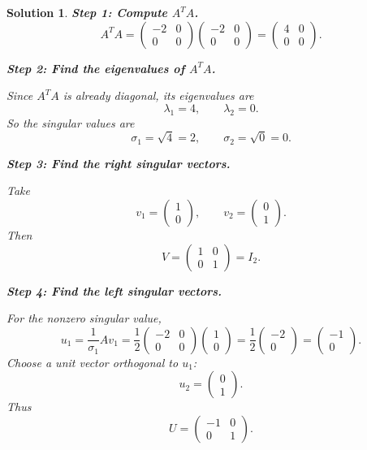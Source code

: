 \documentclass[11pt,a4paper]{article}
\theoremstyle{sol}
\newtheorem*{solution}{Solution}
\begin{document}
\begin{solution}
\textbf{Step 1: Compute $A^TA$.}
\[
A^TA=
\begin{pmatrix}-2&0\\0&0\end{pmatrix}
\begin{pmatrix}-2&0\\0&0\end{pmatrix}
=
\begin{pmatrix}4&0\\0&0\end{pmatrix}.
\]

\textbf{Step 2: Find the eigenvalues of $A^TA$.}

Since $A^TA$ is already diagonal, its eigenvalues are
\[
\lambda_1=4,\qquad \lambda_2=0.
\]
So the singular values are
\[
\sigma_1=\sqrt{4}=2,\qquad \sigma_2=\sqrt{0}=0.
\]

\textbf{Step 3: Find the right singular vectors.}

Take
\[
v_1=\begin{pmatrix}1\\0\end{pmatrix},
\qquad
v_2=\begin{pmatrix}0\\1\end{pmatrix}.
\]
Then
\[
V=\begin{pmatrix}1&0\\0&1\end{pmatrix}=I_2.
\]

\textbf{Step 4: Find the left singular vectors.}

For the nonzero singular value,
\[
u_1=\frac{1}{\sigma_1}Av_1
=\frac{1}{2}
\begin{pmatrix}-2&0\\0&0\end{pmatrix}
\begin{pmatrix}1\\0\end{pmatrix}
=\frac{1}{2}\begin{pmatrix}-2\\0\end{pmatrix}
=\begin{pmatrix}-1\\0\end{pmatrix}.
\]
Choose a unit vector orthogonal to $u_1$:
\[
u_2=\begin{pmatrix}0\\1\end{pmatrix}.
\]
Thus
\[
U=
\begin{pmatrix}
-1&0\\
0&1
\end{pmatrix}.
\]


\end{solution}
\end{document}
